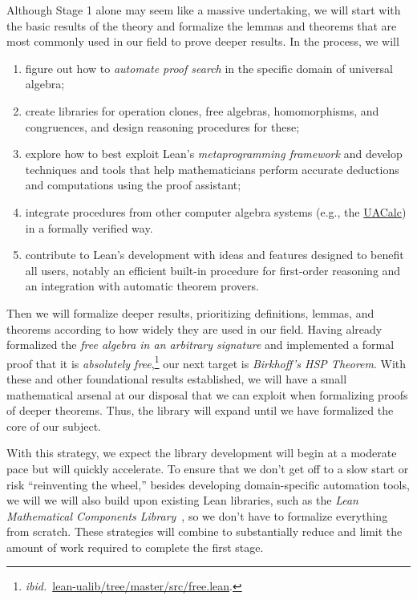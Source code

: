 \documentclass[11pt]{amsart}  %
\begin{document}
Although Stage 1 alone may seem like a massive undertaking, we will start with the
basic results of the theory and formalize the lemmas and theorems that are most commonly
used in our field to prove deeper results.
In the process, we will
\begin{enumerate}
  \item figure out how to \emph{automate proof search} in the specific domain of universal algebra;
  \item create libraries for operation clones, free algebras, homomorphisms, and congruences, and design reasoning procedures for these;
  \item explore how to best exploit Lean's \emph{metaprogramming framework} and develop techniques and tools that help mathematicians perform accurate deductions and computations using the proof assistant;
  \item integrate procedures from other computer algebra systems (e.g., the \href{http://uacalc.org}{UACalc}) in a formally verified way.
  \item contribute to Lean's development with ideas and features designed to benefit all users, notably an efficient built-in procedure for first-order reasoning and an integration with automatic theorem provers.
\end{enumerate}

Then we will formalize deeper results, prioritizing definitions, lemmas, and theorems
according to how widely they are used in our field. Having already formalized the \emph{free algebra in an arbitrary signature} and implemented a formal proof that it is \emph{absolutely free},\footnote{{\it ibid.}~\href{https://github.com/UniversalAlgebra/lean-ualib/blob/master/src/free.lean}{lean-ualib/tree/master/src/free.lean}.} our next target is \emph{Birkhoff's HSP Theorem}. With these and other foundational results established, we will have a small mathematical arsenal 
at our disposal that we can exploit when formalizing proofs of deeper theorems. Thus, the library will expand until we have formalized the core of our subject.

With this strategy, we expect the library development will begin at a moderate pace but will quickly accelerate.  To ensure that we don't get off to a slow start or risk ``reinventing the wheel,'' besides developing domain-specific automation tools, we will we will also build upon existing Lean libraries, such as the \emph{Lean Mathematical Components Library}~\cite{lean-mathlib:2018}, so we don't have to formalize everything from scratch. These strategies will combine to substantially reduce and limit the amount of work required to complete the first stage.
\end{document}
